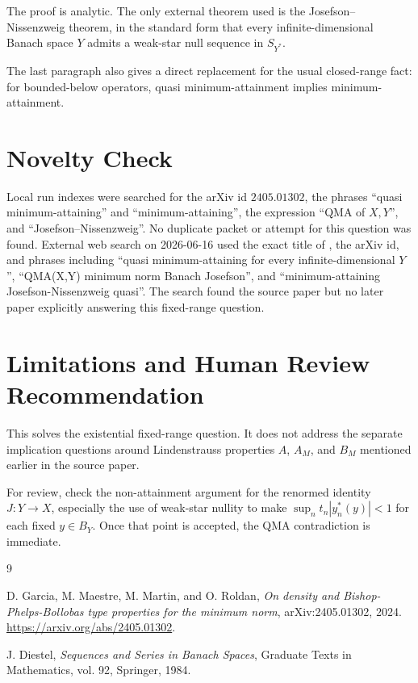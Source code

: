 \documentclass[11pt]{amsart}
\begin{document}
The proof is analytic. The only external theorem used is the
Josefson--Nissenzweig theorem, in the standard form that every
infinite-dimensional Banach space \(Y\) admits a weak-star null sequence in
\(S_{Y^*}\).

The last paragraph also gives a direct replacement for the usual closed-range
fact: for bounded-below operators, quasi minimum-attainment implies
minimum-attainment.

\section*{Novelty Check}

Local run indexes were searched for the arXiv id \(2405.01302\), the phrases
``quasi minimum-attaining'' and ``minimum-attaining'', the expression
``QMA of \(X,Y\)'', and ``Josefson--Nissenzweig''.
No duplicate packet or attempt for this question was found. External web
search on 2026-06-16 used the exact title of \cite{GMMR}, the arXiv id, and
phrases including ``quasi minimum-attaining for every infinite-dimensional
\(Y\)'', ``QMA(X,Y) minimum norm Banach Josefson'', and
``minimum-attaining Josefson-Nissenzweig quasi''. The search found the source
paper but no later paper explicitly answering this fixed-range question.

\section*{Limitations and Human Review Recommendation}

This solves the existential fixed-range question. It does not address the
separate implication questions around Lindenstrauss properties \(A\), \(A_M\),
and \(B_M\) mentioned earlier in the source paper.

For review, check the non-attainment argument for the renormed identity
\(J:Y\to X\), especially the use of weak-star nullity to make
\(\sup_n t_n|y_n^*(y)|<1\) for each fixed \(y\in B_Y\). Once that point is
accepted, the QMA contradiction is immediate.

\begin{thebibliography}{9}

D. Garcia, M. Maestre, M. Martin, and O. Roldan,
\emph{On density and Bishop-Phelps-Bollobas type properties for the minimum norm},
arXiv:2405.01302, 2024.
\url{https://arxiv.org/abs/2405.01302}.

J. Diestel,
\emph{Sequences and Series in Banach Spaces},
Graduate Texts in Mathematics, vol. 92, Springer, 1984.

\end{thebibliography}
\end{document}
